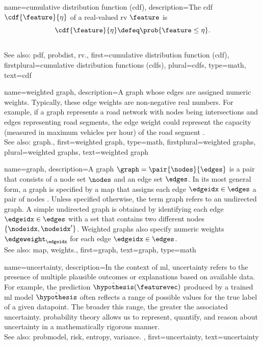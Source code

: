 {name={cumulative distribution function (cdf)},
	description={The  cdf 
	$\cdf{\feature}{\eta}$ of a real-valued \gls{rv} $\feature$ is \cite{AshProbMeasure,papoulis}
	$$\cdf{\feature}{\eta} \defeq \prob{\feature \leq \eta}.$$
					\\ 
		See also: \gls{pdf}, \gls{probdist}, \gls{rv}.},
	first={cumulative distribution function (cdf)},
	firstplural={cumulative distribution functions (cdfs)}, 
	plural={cdfs}, 
	type=math,
	text={cdf} 
}

{name={weighted graph},
	description={A \gls{graph} whose edges 
	are assigned numeric weights. Typically, these edge weights 
	are non-negative real numbers. For example, if a graph represents 
	a road network with nodes being intersections and edges representing 
	road segments, the edge weight could represent the capacity (measured 
	in maximum vehicles per hour) of the road segment \cite{NewmannBook}.  
					\\ 
		See also: \gls{graph}.},
	first={weighted graph},
	type=math,
	firstplural={weighted graphs}, 
	plural={weighted graphs}, 
	text={weighted graph} 
}



{name={graph},
 description={A graph $\graph = \pair{\nodes}{\edges}$ 
 is a pair that consists of a node set $\nodes$ and an edge set $\edges$. 
 In its most general form, a graph is specified by a \gls{map} that 
 assigns each edge $\edgeidx \in \edges$ a pair of nodes \cite{RockNetworks}. 
 Unless specified otherwise, the term graph refers to an undirected graph. 
 A simple undirected graph is obtained by identifying each edge $\edgeidx \in \edges$ 
 with a set that contains two different nodes $\{\nodeidx,\nodeidx'\}$. 
 Weighted graphs also specify numeric \gls{weights} $\edgeweight_{\edgeidx}$ for each 
 edge $\edgeidx \in \edges$.
					\\ 
		See also: \gls{map}, \gls{weights}.},
 first={graph},
 text={graph}, 
 type=math
}

{name={uncertainty},
	description={In the context of \gls{ml}, uncertainty refers to the presence of multiple 
		plausible outcomes or \glspl{explanation} based on available \gls{data}. For example, the 
		\gls{prediction} $\hat{\hypothesis}(\featurevec)$ produced by a trained \gls{ml} \gls{model} $\hat{\hypothesis}$
	 	often reflects a range of possible values for the true \gls{label} of a given \gls{datapoint}. 
	 	The broader this range, the greater the associated uncertainty. \Gls{probability} theory 
	 	allows us to represent, quantify, and reason about uncertainty in a 
	 	mathematically rigorous manner.
					\\ 
		See also: \gls{probmodel}, \gls{risk}, \gls{entropy}, \gls{variance}. },
	first={uncertainty},
	text={uncertainty}
}

